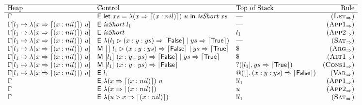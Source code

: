 \begin{figure*}
\[
  \begin{array}{lllr}
    \hline
    \text{Heap}                             & \text{Control}                                             & \text{Top of Stack}                        & \text{Rule}            \\
    \hline
    \Gamma                                  & \textsf{E}~\textsf{let}~xs = \lambda(x \Rightarrow \left\lceil (x : nil)\right\rceil)~u~\textsf{in}~\textit{isShort}~xs & \text{---}                                 & (\textsc{Let}_{\Rightarrow})      \\
    \Gamma[l_1 \mapsto \lambda(x \Rightarrow \left\lceil (x : nil)\right\rceil)~u]
                                            & \textsf{E}~\textit{isShort}~l_1                                 & \text{---}                                 & (\textsc{App1}_{\Rightarrow})     \\
    \Gamma[l_1 \mapsto \lambda(x \Rightarrow \left\lceil (x : nil)\right\rceil)~u] & \textsf{E}~\textit{isShort}                                            & l_1                                        & (\textsc{App2}_{\Rightarrow})     \\
    \Gamma[l_1 \mapsto \lambda(x \Rightarrow \left\lceil (x : nil)\right\rceil)~u] & \textsf{E}~\lambda(l_1\rhd (x : y : ys) \Rightarrow \left\lceil \textsf{False}\right\rceil \mid ys \Rightarrow \left\lceil \textsf{True}\right\rceil)              & \text{---}                                 & (\textsc{Sat}_{\Rightarrow})      \\
    \Gamma[l_1 \mapsto \lambda(x \Rightarrow \left\lceil (x : nil)\right\rceil)~u] & \textsf{M}~[\,]~l_1\rhd (x : y : ys) \Rightarrow \left\lceil \textsf{False}\right\rceil \mid ys \Rightarrow \left\lceil \textsf{True}\right\rceil                 & \$                                         & (\textsc{Arg}_{\Rightarrow})      \\
    \Gamma[l_1 \mapsto \lambda(x \Rightarrow \left\lceil (x : nil)\right\rceil)~u] & \textsf{M}~[l_1]~(x : y : ys) \Rightarrow \left\lceil \textsf{False}\right\rceil \mid ys \Rightarrow \left\lceil \textsf{True}\right\rceil                                & \$                                         & (\textsc{Alt1}_{\Rightarrow})     \\
    \Gamma[l_1 \mapsto \lambda(x \Rightarrow \left\lceil (x : nil)\right\rceil)~u] & \textsf{M}~[l_1]~(x : y : ys) \Rightarrow \left\lceil \textsf{False}\right\rceil          & ?([l_1],ys \Rightarrow \left\lceil \textsf{True}\right\rceil)           & (\textsc{Cons1}_{\Rightarrow})    \\
    \Gamma[l_1 \mapsto \lambda(x \Rightarrow \left\lceil (x : nil)\right\rceil)~u] & \textsf{E}~l_1                                                 & @([\,],(x : y : ys) \Rightarrow \left\lceil \textsf{False}\right\rceil) & (\textsc{Var}_{\Rightarrow})      \\
    \Gamma                                  & \textsf{E}~\lambda(x \Rightarrow \left\lceil (x : nil)\right\rceil)~u                                 & !l_1                                       & (\textsc{App1}_{\Rightarrow})     \\
    \Gamma                                  & \textsf{E}~\lambda(x \Rightarrow \left\lceil (x : nil)\right\rceil)                                          & u                                          & (\textsc{App2}_{\Rightarrow})     \\
    \Gamma                                  & \textsf{E}~\lambda(u\rhd x \Rightarrow \left\lceil (x : nil)\right\rceil)    & !l_1                                       & (\textsc{Sat}_{\Rightarrow})      \\

\end{array}\]
\end{figure*}

